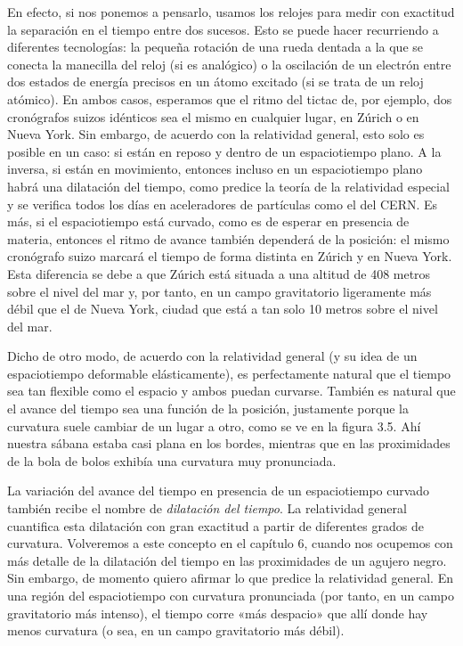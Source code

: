 En efecto, si nos ponemos a pensarlo, usamos los relojes para medir con exactitud
la separación en el tiempo entre dos sucesos. Esto se puede hacer recurriendo a
diferentes tecnologías: la pequeña rotación de una rueda dentada a la que se conecta
la manecilla del reloj (si es analógico) o la oscilación de un electrón entre dos
estados de energía precisos en un átomo excitado (si se trata de un reloj atómico).
En ambos casos, esperamos que el ritmo del tictac de, por ejemplo, dos cronógrafos
suizos idénticos sea el mismo en cualquier lugar, en Zúrich o en Nueva York. Sin
embargo, de acuerdo con la relatividad general, esto solo es posible en un caso:
si están en reposo y dentro de un espaciotiempo plano. A la inversa, si están en
movimiento, entonces incluso en un espaciotiempo plano habrá una dilatación del
tiempo, como predice la teoría de la relatividad
especial y se verifica todos los días en aceleradores
de partículas como el del CERN. Es más, si el espaciotiempo está
curvado, como es de esperar en presencia de materia, entonces el ritmo de avance
también dependerá de la posición: el mismo cronógrafo suizo marcará el tiempo de
forma distinta en Zúrich y en Nueva York. Esta diferencia se debe a que Zúrich está
situada a una altitud de 408 metros sobre el nivel del mar y, por tanto, en un
campo gravitatorio ligeramente más débil que el de Nueva York, ciudad que está a
tan solo 10 metros sobre el nivel del mar.

Dicho de otro modo, de acuerdo con la relatividad general
(y su idea de un espaciotiempo deformable elásticamente), es perfectamente natural
que el tiempo sea tan flexible como el espacio y ambos puedan curvarse. También es
natural que el avance del tiempo sea una función de la posición, justamente porque
la curvatura suele cambiar de un lugar a otro, como se ve en la figura 3.5. Ahí
nuestra sábana estaba casi plana en los bordes, mientras que en las proximidades de
la bola de bolos exhibía una curvatura muy pronunciada.

La variación del avance del tiempo en presencia de un espaciotiempo curvado también
recibe el nombre de \emph{dilatación del tiempo}. La
relatividad general cuantifica esta dilatación con gran
exactitud a partir de diferentes grados de curvatura. Volveremos a este concepto en
el capítulo 6, cuando nos ocupemos con más detalle de la dilatación del
tiempo en las proximidades de un agujero negro. Sin
embargo, de momento quiero afirmar lo que predice la relatividad general. En una
región del espaciotiempo con curvatura pronunciada (por tanto, en un campo
gravitatorio más intenso), el tiempo corre «más despacio» que allí donde hay menos
curvatura (o sea, en un campo gravitatorio más débil).


